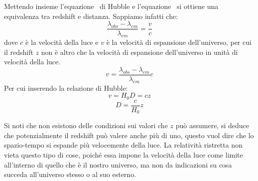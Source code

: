 Mettendo insieme l'equazione~ di Hubble e l'equazione~ si ottiene una equivalenza tra redshift e distanza. Sappiamo infatti che:
\[
    \frac{\lambda_{obs} - \lambda_{em}}{\lambda_{em}} = \frac{v}{c}
\]
dove $c$ è la velocità della luce e $v$ è la velocità di espansione dell'universo, per cui il redshift $z$ non è altro che la velocità di espansione dell'universo in unità di velocità della luce.
\[
    v = \frac{\lambda_{obs} - \lambda_{em}}{\lambda_{em}} c
\]
Per cui inserendo la relazione di Hubble:
\[
    v = H_0 D = c z
\]
\begin{equation}\label{eq:ditanza-redshift}
    D = \frac{c}{H_0}z
\end{equation}

Si noti che non esistono delle condizioni sui valori che $z$ può assumere, si deduce che potenzialmente il redshift può valere anche più di uno, questo vuol dire che lo spazio-tempo si espande più velocemente della luce. La relatività ristretta non vieta questo tipo di cose, poiché essa impone la velocità della luce come limite all'interno di quello che è il nostro universo, ma non da indicazioni su cosa succeda all'universo stesso o al suo esterno.